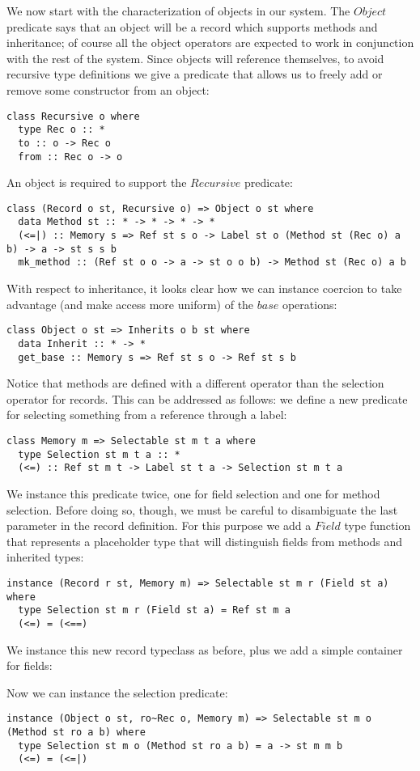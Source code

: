 We now start with the characterization of objects in our system. The $Object$ predicate says that an object will be a record which supports methods and inheritance; of course all the object operators are expected to work in conjunction with the rest of the system. Since objects will reference themselves, to avoid recursive type definitions we give a predicate that allows us to freely add or remove some constructor from an object:
\begin{lstlisting}
class Recursive o where
  type Rec o :: *
  to :: o -> Rec o
  from :: Rec o -> o
\end{lstlisting}

An object is required to support the $Recursive$ predicate:
\begin{lstlisting}
class (Record o st, Recursive o) => Object o st where
  data Method st :: * -> * -> * -> *
  (<=|) :: Memory s => Ref st s o -> Label st o (Method st (Rec o) a b) -> a -> st s s b
  mk_method :: (Ref st o o -> a -> st o o b) -> Method st (Rec o) a b
\end{lstlisting}

With respect to inheritance, it looks clear how we can instance coercion to take advantage (and make access more uniform) of the $base$ operations:
\begin{lstlisting}
class Object o st => Inherits o b st where
  data Inherit :: * -> *
  get_base :: Memory s => Ref st s o -> Ref st s b
\end{lstlisting}

Notice that methods are defined with a different operator than the selection operator for records. This can be addressed as follows: we define a new predicate for selecting something from a reference through a label:
\begin{lstlisting}
class Memory m => Selectable st m t a where
  type Selection st m t a :: *
  (<=) :: Ref st m t -> Label st t a -> Selection st m t a
\end{lstlisting}

We instance this predicate twice, one for field selection and one for method selection. Before doing so, though, we must be careful to disambiguate the last parameter in the record definition. For this purpose we add a $Field$ type function that represents a placeholder type that will distinguish fields from methods and inherited types:
\begin{lstlisting}
instance (Record r st, Memory m) => Selectable st m r (Field st a) where
  type Selection st m r (Field st a) = Ref st m a
  (<=) = (<==)
\end{lstlisting}

We instance this new record typeclass as before, plus 
we add a simple container for fields:

Now we can instance the selection predicate:
\begin{lstlisting}
instance (Object o st, ro~Rec o, Memory m) => Selectable st m o (Method st ro a b) where
  type Selection st m o (Method st ro a b) = a -> st m m b
  (<=) = (<=|)
\end{lstlisting}

